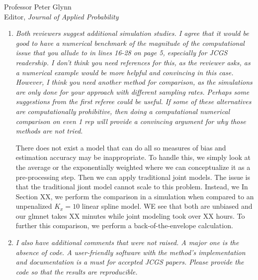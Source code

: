 \documentclass[11pt]{letter} %
\begin{document}
\begin{letter}{Professor
	Peter Glynn\\
	Editor, {\em Journal of Applied Probability}}
\begin{enumerate}
\vspace{5mm}
To accommodate the second referee's request without making the discussion too long, we have added Remark XX and XX that provide some intuition.  We have re-written the technical proofs to first provide a sketch proof (with intuition) and then a detailed proof.  We hope this helps the reader develop intuition on the first read while giving them some helpful guidance in order to facilitate understanding of the detailed theoretical analysis.
\vspace{5mm}

\item {\it Both reviewers suggest additional simulation studies. I agree that it would be good to have a numerical benchmark of the magnitude of the computational issue that you allude to in lines 16-28 on page 5, especially for JCGS readership. I don’t think you need references for this, as the reviewer asks, as a numerical example would be more helpful and convincing in this case. However, I think you need another method for comparison, as the simulations are only done for your approach with different sampling rates. Perhaps some suggestions from the first referee could be useful. If some of these alternatives are computationally prohibitive, then doing a computational numerical comparison on even 1 rep will provide a convincing argument for why those methods are not tried.}

\vspace{5mm}
There does not exist a model that can do all so measures of bias and estimation accuracy may be inappropriate.  To handle this, we simply look at the average or the exponentially weighted where we can conceptualize it as a pre-processing step.  Then we can apply traditional joint models.  The issue is that the traditional jiont model cannot scale to this problem.  Instead, we
In Section XX, we perform the comparison in a simulation when compared to an unpenalized $K_x = 10$ linear spline model.  WE see that both are unbiased and our glmnet takes XX minutes while joint modeling took over XX hours.  To further this comparison, we perform a back-of-the-envelope calculation.
\vspace{5mm}

\item {\it I also have additional comments that were not raised. A major one is the absence of code. A user-friendly software with the method’s implementation and documentation is a must for accepted JCGS papers. Please provide the code so that the results are reproducible.}


\end{enumerate}
\end{letter}
\end{document}
